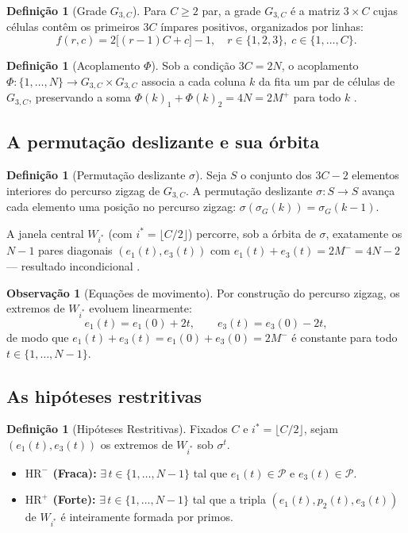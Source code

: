 \documentclass[12pt,a4paper]{article}
\theoremstyle{definition}
\newtheorem{definition}[theorem]{Definição}
\newtheorem{remark}[theorem]{Observação}
\newcommand{\PP}{\mathcal{P}}          %
\newcommand{\HRm}{\mathrm{HR}^{-}}
\newcommand{\HRp}{\mathrm{HR}^{+}}
\begin{document}
	\begin{definition}[Grade $G_{3,C}$]
		Para $C \geq 2$ par, a grade $G_{3,C}$ é a matriz $3 \times C$ cujas
		células contêm os primeiros $3C$ ímpares positivos, organizados por linhas:
		\[
		f(r,c) = 2\bigl[(r-1)C + c\bigr] - 1,\quad r \in \{1,2,3\},\; c \in \{1,\ldots,C\}.
		\]
	\end{definition}
	
	\begin{definition}[Acoplamento $\Phi$]
		Sob a condição $3C = 2N$, o acoplamento $\Phi: \{1,\ldots,N\} \to
		G_{3,C}\times G_{3,C}$ associa a cada coluna $k$ da fita um par de células
		de $G_{3,C}$, preservando a soma $\Phi(k)_1 + \Phi(k)_2 = 4N = 2M^+$
		para todo $k$ \cite[Prop.~3.5]{motor}.
	\end{definition}
	
	\subsection{A permutação deslizante e sua órbita}
	
	\begin{definition}[Permutação deslizante $\sigma$]
		Seja $S$ o conjunto dos $3C-2$ elementos interiores do percurso zigzag
		de $G_{3,C}$. A permutação deslizante $\sigma: S \to S$ avança cada
		elemento uma posição no percurso zigzag: $\sigma(\sigma_G(k)) =
		\sigma_G(k-1)$.
	\end{definition}
	
	A janela central $W_{i^*}$ (com $i^* = \lfloor C/2 \rfloor$) percorre,
	sob a órbita de $\sigma$, exatamente os $N-1$ pares diagonais
	$(e_1(t), e_3(t))$ com $e_1(t) + e_3(t) = 2M^- = 4N - 2$ — resultado
	incondicional \cite[Prop.~4.3, Prop.~4.6]{motor}.
	
	\begin{remark}[Equações de movimento]
		\label{rem:movimento}
		Por construção do percurso zigzag, os extremos de $W_{i^*}$ evoluem
		linearmente:
		\[
		e_1(t) = e_1(0) + 2t,\qquad e_3(t) = e_3(0) - 2t,
		\]
		de modo que $e_1(t) + e_3(t) = e_1(0) + e_3(0) = 2M^-$ é constante
		para todo $t \in \{1,\ldots,N-1\}$.
	\end{remark}
	
	\subsection{As hipóteses restritivas}
	
	\begin{definition}[Hipóteses Restritivas]
		\label{def:HR}
		Fixados $C$ e $i^* = \lfloor C/2 \rfloor$, sejam $(e_1(t), e_3(t))$ os
		extremos de $W_{i^*}$ sob $\sigma^t$.
		
		\begin{itemize}
			\item \textbf{$\HRm$ (Fraca):} $\exists\, t \in \{1,\ldots,N-1\}$
			tal que $e_1(t) \in \PP$ e $e_3(t) \in \PP$.
			\item \textbf{$\HRp$ (Forte):} $\exists\, t \in \{1,\ldots,N-1\}$
			tal que a tripla $(e_1(t), p_2(t), e_3(t))$ de $W_{i^*}$ é
			inteiramente formada por primos.
		\end{itemize}
	\end{definition}
	
\end{document}
